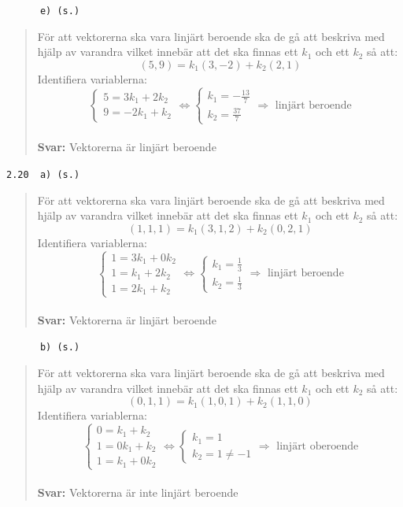 \documentclass[a4paper]{article}
\newcommand{\tskcol}[1]{\textcolor{tskcol}{#1}}
\begin{document}
\pagebreak
\texttt{\tskcol{~~~~~~e) (s.)}}
\begin{quotation}
	\noindent
	För att vektorerna ska vara linjärt beroende ska de gå att beskriva med hjälp av varandra vilket innebär att det ska finnas ett $k_1$ och ett $k_2$ så att:
	\[(5,9)=k_1(3,-2)+k_2(2,1)\]
	Identifiera variablerna:
	\[\begin{cases}
	5=3k_1+2k_2 \\
	9=-2k_1+k_2
	\end{cases} \Leftrightarrow
	\begin{cases}
	k_1=-\frac{13}{7} \\
	k_2=\frac{37}{7}
	\end{cases} \Rightarrow \text{ linjärt beroende}\]
	\\
	\textbf{Svar:} Vektorerna är linjärt beroende
\end{quotation}

\texttt{\tskcol{2.20~~a) (s.)}}
\begin{quotation}
	\noindent
	För att vektorerna ska vara linjärt beroende ska de gå att beskriva med hjälp av varandra vilket innebär att det ska finnas ett $k_1$ och ett $k_2$ så att:
	\[(1,1,1)=k_1(3,1,2)+k_2(0,2,1)\]
	Identifiera variablerna:
	\[\begin{cases}
	1=3k_1+0k_2 \\
	1=k_1+2k_2 \\
	1=2k_1+k_2
	\end{cases} \Leftrightarrow
	\begin{cases}
	k_1=\frac{1}{3} \\
	k_2=\frac{1}{3}
	\end{cases} \Rightarrow \text{ linjärt beroende}\]
	\\
	\textbf{Svar:} Vektorerna är linjärt beroende
\end{quotation}

\texttt{\tskcol{~~~~~~b) (s.)}}
\begin{quotation}
	\noindent
	För att vektorerna ska vara linjärt beroende ska de gå att beskriva med hjälp av varandra vilket innebär att det ska finnas ett $k_1$ och ett $k_2$ så att:
	\[(0,1,1)=k_1(1,0,1)+k_2(1,1,0)\]
	Identifiera variablerna:
	\[\begin{cases}
	0=k_1+k_2 \\
	1=0k_1+k_2 \\
	1=k_1+0k_2
	\end{cases} \Leftrightarrow
	\begin{cases}
	k_1=1 \\
	k_2=1\neq-1
	\end{cases} \Rightarrow \text{ linjärt oberoende}\]
	\\
	\textbf{Svar:} Vektorerna är inte linjärt beroende
\end{quotation}
\end{document}
